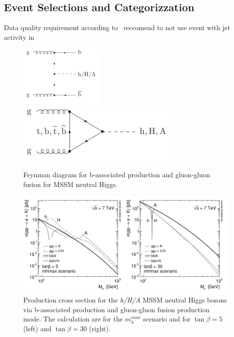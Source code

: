 \subsection{Event Selections and Categorizzation}\label{sec:topology}
Data quality requirement according to~\cite{ATLASCLEANING} reccomend to not use event with jet activity in 


\begin{figure}[tp]
     \begin{center}

            \includegraphics[height=3cm]{figure/bba.png}
            \includegraphics[height=3cm]{figure/ggf.png}

    \end{center}
    \caption{Feynman diagram for b-associated production and gluon-gluon fusion for MSSM neutral Higgs.}
   \label{fig:prod}
\end{figure}

\begin{figure}[tp]
     \begin{center}

            \includegraphics[width=\textwidth]{figure/xsec.png}

    \end{center}
    \caption{Production cross section for the \emph{h/H/A} MSSM neutral Higgs bosons via b-associated production and
	gluon-gluon fusion production mode. The calculation are for the $m_h^{max}$ scenario and for $\tan \beta=5$ (left) and $\tan \beta=30$ (right).}
   \label{fig:xsec}
\end{figure}

